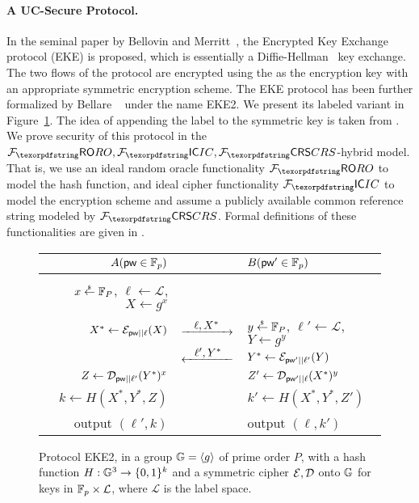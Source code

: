\paragraph{A UC-Secure \liPAKE Protocol.}
In the seminal paper by Bellovin and Merritt~\cite{SP:BelMer92}, the Encrypted Key Exchange protocol (EKE) is proposed, which is essentially a Diffie-Hellman~\cite{DifHel76} key exchange. The two flows of the protocol are encrypted using the \password as the encryption key with an appropriate symmetric encryption scheme. The EKE protocol has been further formalized by Bellare \etal~\cite{EC:BelPoiRog00} under the name EKE2. We present its labeled variant in Figure~\ref{fig:EKE2}. The idea of appending the label to the symmetric key is taken from \cite{RSA:ACCP08}. We prove security of this protocol in the $\Fro,\Fic,\Fcrs$-hybrid model. That is, we use an ideal random oracle functionality $\Fro$ to model the hash function, and ideal cipher functionality $\Fic$ to model the encryption scheme and assume a publicly available common reference string modeled by $\Fcrs$. Formal definitions of these functionalities are given in .

\begin{figure}[tbp]
  \centering
  \begin{fboxenv}
  \begin{tabular}{rcl}
     $A(\mathsf{pw}\in\mathbb{F}_{p})$ &   & $B(\mathsf{pw}'\in\mathbb{F}_{p})$ \\ \hline \\
     $x \stackrel{{}_\$}{\leftarrow} \mathbb{F}_P$, $\ell\gets\mathcal{L}$, $X \gets g^{x}$ \\
     $X^*\gets \mathcal{E}_{\mathsf{pw}||\ell}(X)$
        & $\Rsflow{\ell,X^*}$ &
           $y \stackrel{{}_\$}{\leftarrow} \mathbb{F}_P$, $\ell'\gets\mathcal{L}$, $Y \gets g^y$ \\
        & $\Lsflow{\ell',Y^*}$ &
           $Y^*\gets \mathcal{E}_{\mathsf{pw}'||\ell'}(Y)$ \\
     $Z \gets \mathcal{D}_{\mathsf{pw}||\ell'}(Y^*)^{x}$ 
        && $Z' \gets \mathcal{D}_{\mathsf{pw}'||\ell}(X^*)^{y}$ \\
     $k\gets H(X^*,Y^*,Z)$
        && $k'\gets H(X^*,Y^*,Z')$ \\
     output $(\ell',k)$ 
        && output $(\ell,k')$\\
  \end{tabular}
  \end{fboxenv}
  \caption{Protocol EKE2, in a group $\mathbb{G} = \langle g \rangle$ of prime order $P$, with a hash function $H:\mathbb{G}^3\rightarrow \{0,1\}^k$ and a symmetric cipher $\mathcal{E},\mathcal{D}$ onto $\mathbb{G}$ for keys in $\mathbb{F}_p\times\mathcal{L}$, where $\mathcal{L}$ is the label space.}\label{fig:EKE2}
\vspace*{-1em}\end{figure}

